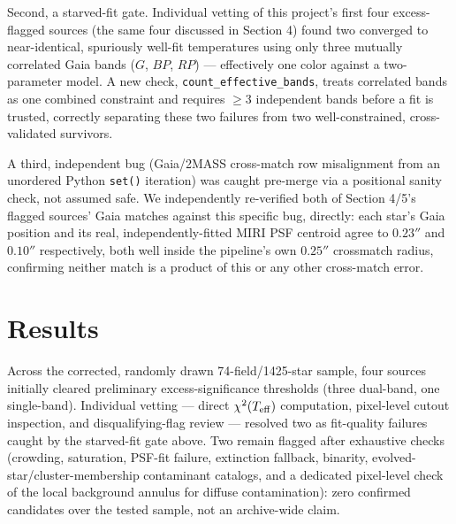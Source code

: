 \documentclass[RNAAS]{aastex7}
\begin{document}
Second, a starved-fit gate. Individual vetting of this project's first
four excess-flagged sources (the same four discussed in Section 4)
found two converged to near-identical, spuriously well-fit
temperatures using only three mutually correlated Gaia bands ($G$,
$BP$, $RP$) --- effectively one color against a two-parameter model. A
new check, \texttt{count\_effective\_bands}, treats correlated bands
as one combined constraint and requires $\geq3$ independent bands
before a fit is trusted, correctly separating these two failures from
two well-constrained, cross-validated survivors.

A third, independent bug (Gaia/2MASS cross-match row misalignment from
an unordered Python \texttt{set()} iteration) was caught pre-merge via
a positional sanity check, not assumed safe. We independently
re-verified both of Section 4/5's flagged sources' Gaia matches against
this specific bug, directly: each star's Gaia position and its real,
independently-fitted MIRI PSF centroid agree to $0.23''$ and $0.10''$
respectively, both well inside the pipeline's own $0.25''$ crossmatch
radius, confirming neither match is a product of this or any other
cross-match error.

\section{Results}

Across the corrected, randomly drawn 74-field/1425-star sample, four
sources initially cleared preliminary excess-significance thresholds
(three dual-band, one single-band). Individual vetting --- direct
$\chi^2(T_{\rm eff})$ computation, pixel-level cutout inspection, and
disqualifying-flag review --- resolved two as fit-quality failures caught by the starved-fit gate above. Two
remain flagged after exhaustive checks (crowding, saturation, PSF-fit
failure, extinction fallback, binarity, evolved-star/cluster-membership
contaminant catalogs, and a dedicated pixel-level check of the local
background annulus for diffuse contamination): zero confirmed
candidates over the tested sample, not an archive-wide claim.
\end{document}
